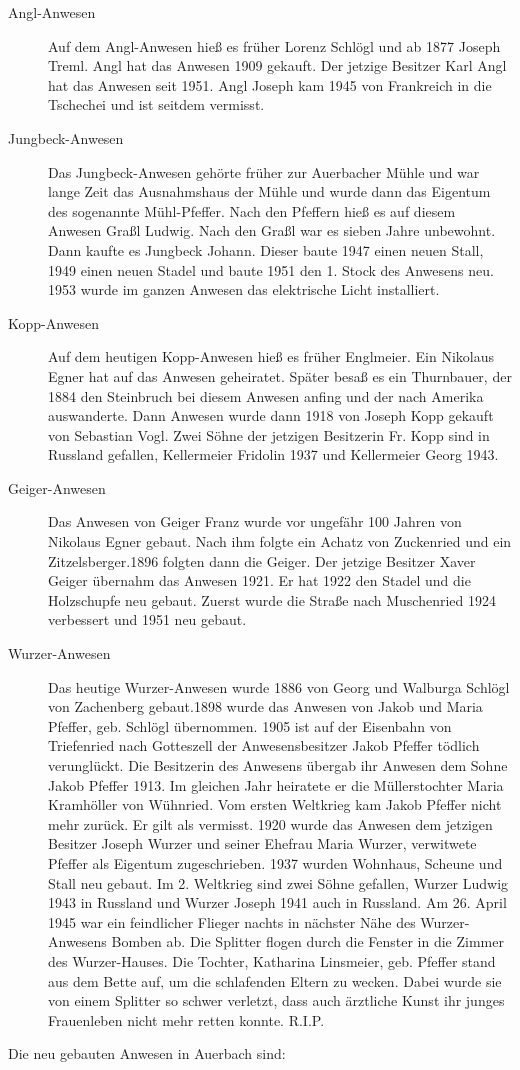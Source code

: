 \documentclass[12pt,a4pager,draft]{book}
\begin{document}
\begin{description}
\item[Angl-Anwesen] Auf dem Angl-Anwesen hieß es früher Lorenz Schlögl und ab
1877 Joseph Treml. Angl hat das Anwesen 1909 gekauft. Der jetzige Besitzer Karl
Angl hat das Anwesen seit 1951. Angl Joseph kam 1945 von Frankreich in die
Tschechei und ist seitdem vermisst.

\item[Jungbeck-Anwesen] Das Jungbeck-Anwesen gehörte früher zur Auerbacher
Mühle und war lange Zeit das Ausnahmshaus der Mühle und wurde dann das Eigentum
des sogenannte Mühl-Pfeffer. Nach den Pfeffern hieß es auf diesem Anwesen Graßl
Ludwig. Nach den Graßl war es sieben Jahre unbewohnt. Dann kaufte es Jungbeck
Johann. Dieser baute 1947 einen neuen Stall, 1949 einen neuen Stadel und baute
1951 den 1. Stock des Anwesens neu. 1953 wurde im ganzen Anwesen das elektrische
Licht installiert.

\item[Kopp-Anwesen] Auf dem heutigen Kopp-Anwesen hieß es früher Englmeier. Ein
Nikolaus Egner hat auf das Anwesen geheiratet. Später besaß es ein Thurnbauer,
der 1884 den Steinbruch bei diesem Anwesen anfing und der nach Amerika
auswanderte. Dann Anwesen wurde dann 1918 von Joseph Kopp gekauft von Sebastian
Vogl. Zwei Söhne der jetzigen Besitzerin Fr. Kopp sind in Russland gefallen,
Kellermeier Fridolin 1937 und Kellermeier Georg 1943.

\item[Geiger-Anwesen] Das Anwesen von Geiger Franz wurde vor ungefähr 100
Jahren von Nikolaus Egner gebaut. Nach ihm folgte ein Achatz von Zuckenried und
ein Zitzelsberger.1896 folgten dann die Geiger. Der jetzige Besitzer Xaver
Geiger übernahm das Anwesen 1921. Er hat 1922 den Stadel und die Holzschupfe neu
gebaut. Zuerst wurde die Straße nach Muschenried 1924 verbessert und 1951 neu
gebaut.

\item[Wurzer-Anwesen] Das heutige Wurzer-Anwesen wurde 1886 von Georg und
Walburga Schlögl von Zachenberg gebaut.1898 wurde das Anwesen von Jakob und
Maria Pfeffer, geb. Schlögl übernommen. 1905 ist auf der Eisenbahn von
Triefenried nach Gotteszell der Anwesensbesitzer Jakob Pfeffer tödlich
verunglückt. Die Besitzerin des Anwesens übergab ihr Anwesen dem Sohne Jakob
Pfeffer 1913. Im gleichen Jahr heiratete er die Müllerstochter Maria Kramhöller
von Wühnried. Vom ersten Weltkrieg kam Jakob Pfeffer nicht mehr zurück. Er gilt
als vermisst. 1920 wurde das Anwesen dem jetzigen Besitzer Joseph Wurzer und
seiner Ehefrau Maria Wurzer, verwitwete Pfeffer als Eigentum zugeschrieben. 1937
wurden Wohnhaus, Scheune und Stall neu gebaut. Im 2. Weltkrieg sind zwei Söhne
gefallen, Wurzer Ludwig 1943 in Russland und Wurzer Joseph 1941 auch in
Russland. Am 26. April 1945 war ein feindlicher Flieger nachts in nächster Nähe
des Wurzer-Anwesens Bomben ab. Die Splitter flogen durch die Fenster in die
Zimmer des Wurzer-Hauses. Die Tochter, Katharina Linsmeier, geb. Pfeffer stand
aus dem Bette auf‚ um die schlafenden Eltern zu wecken. Dabei wurde sie von
einem Splitter so schwer verletzt, dass auch ärztliche Kunst ihr junges
Frauenleben nicht mehr retten konnte. R.I.P.
\end{description}
Die neu gebauten Anwesen in Auerbach sind:
\end{document}
